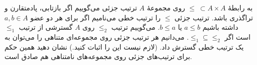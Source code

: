 به رابطهٔ
$\leq\ \subset A\times A$
روی مجموعهٔ
$A$
ترتیب جزئی می‌گوییم اگر بازتابی، پادمتقارن و تراگذری باشد. ترتیب جزئی
$\leq$
را ترتیب خطی می‌نامیم اگر برای هر دو عضو
$a,b\in A$
داشته باشیم
$a\leq b$
یا
$b\leq a$.
می‌گوییم ترتیب
$\leq_2$
روی
$A$
گسترشی از ترتیب
$\leq_1$
است اگر
$\leq_1\subseteq \leq_2$.
می‌دانیم هر ترتیب جزئی روی مجموعه‌ای متناهی را می‌توان به یک ترتیب خطی گسترش داد. (لازم نیست این را اثبات کنید.)
نشان دهید همین حکم برای ترتیب‌های جزئی روی مجموعه‌های نامتناهی هم صادق است.